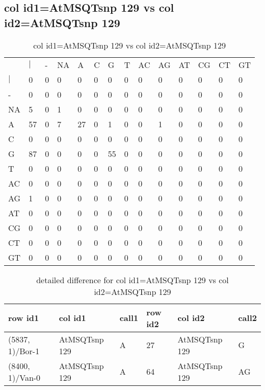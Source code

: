 \subsection{col id1=AtMSQTsnp 129 vs col id2=AtMSQTsnp 129}
\begin{center}
\begin{longtable}{|l|l|l|l|l|l|l|l|l|l|l|l|l|l|}
\caption{col id1=AtMSQTsnp 129 vs col id2=AtMSQTsnp 129} \label{table_dm510}\\
\hline
\\
\hline
&$|$&-&NA&A&C&G&T&AC&AG&AT&CG&CT&GT\\
$|$&0&0&0&0&0&0&0&0&0&0&0&0&0\\
-&0&0&0&0&0&0&0&0&0&0&0&0&0\\
NA&5&0&1&0&0&0&0&0&0&0&0&0&0\\
A&57&0&7&27&0&1&0&0&1&0&0&0&0\\
C&0&0&0&0&0&0&0&0&0&0&0&0&0\\
G&87&0&0&0&0&55&0&0&0&0&0&0&0\\
T&0&0&0&0&0&0&0&0&0&0&0&0&0\\
AC&0&0&0&0&0&0&0&0&0&0&0&0&0\\
AG&1&0&0&0&0&0&0&0&0&0&0&0&0\\
AT&0&0&0&0&0&0&0&0&0&0&0&0&0\\
CG&0&0&0&0&0&0&0&0&0&0&0&0&0\\
CT&0&0&0&0&0&0&0&0&0&0&0&0&0\\
GT&0&0&0&0&0&0&0&0&0&0&0&0&0\\
\hline
\end{longtable}
\end{center}

\begin{center}
\begin{longtable}{|l|l|l|l|l|l|}
\caption{detailed difference for col id1=AtMSQTsnp 129 vs col id2=AtMSQTsnp 129} \label{table_dm511}\\
\hline
row id1&col id1&call1&row id2&col id2&call2\\
\hline
(5837, 1)/Bor-1&AtMSQTsnp 129&A&27&AtMSQTsnp 129&G\\
(8400, 1)/Van-0&AtMSQTsnp 129&A&64&AtMSQTsnp 129&AG\\
\hline
\end{longtable}
\end{center}

